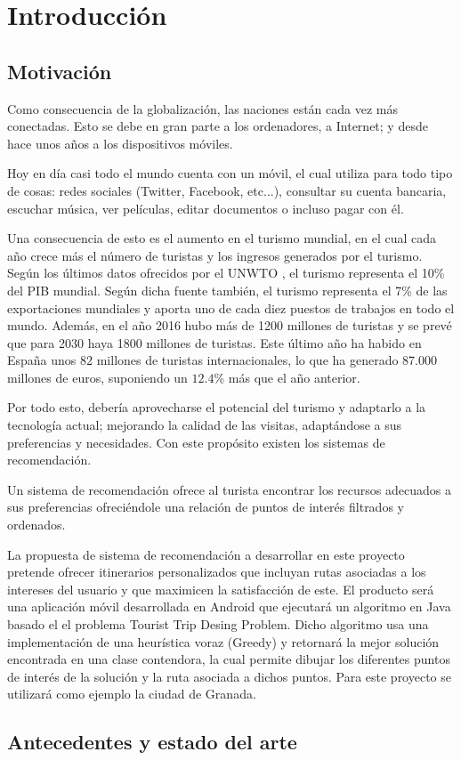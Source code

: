 \chapter{Introducción}

\section[Motivación]{Motivación}
Como consecuencia de la globalización, las naciones están cada vez más conectadas. Esto se debe en gran parte a los ordenadores, a Internet; y desde hace unos años a los dispositivos móviles.\newline

Hoy en día casi todo el mundo cuenta con un móvil, el cual utiliza para todo tipo de cosas: redes sociales (Twitter, Facebook, etc...), consultar su cuenta bancaria, escuchar música, ver películas, editar documentos o incluso pagar con él.\newline

Una consecuencia de esto es el aumento en el turismo mundial, en el cual cada año crece más el número de turistas y los ingresos generados por el turismo. Según los últimos datos ofrecidos por el UNWTO \cite{unwto_resumen}, el turismo representa el 10\% del PIB mundial. Según dicha fuente también, el turismo representa el 7\% de las exportaciones mundiales y aporta uno de cada diez puestos de trabajos en todo el mundo. Además, en el año 2016 hubo más de 1200 millones de turistas y se prevé que para 2030 haya 1800 millones de turistas. Este último año ha habido en España unos 82 millones de turistas internacionales, lo que ha generado 87.000 millones de euros, suponiendo un $12.4\%$ más que el año anterior.\newline

Por todo esto, debería aprovecharse el potencial del turismo y adaptarlo a la tecnología actual; mejorando la calidad de las visitas, adaptándose a sus preferencias y necesidades. Con este propósito existen los sistemas de recomendación.\newline

Un sistema de recomendación ofrece al turista encontrar los recursos adecuados a sus preferencias ofreciéndole una relación de puntos de interés filtrados y ordenados.\newline

La propuesta de sistema de recomendación a desarrollar en este proyecto pretende ofrecer itinerarios personalizados que incluyan rutas asociadas a los intereses del usuario y que maximicen la satisfacción de este. El producto será una aplicación móvil desarrollada en Android que ejecutará un algoritmo en Java basado el el problema Tourist Trip Desing Problem. Dicho algoritmo usa una implementación de una heurística voraz (Greedy) y retornará la mejor solución encontrada en una clase contendora, la cual permite dibujar los diferentes puntos de interés de la solución y la ruta asociada a dichos puntos. Para este proyecto se utilizará como ejemplo la ciudad de Granada.
\section[Antecedentes y estado del arte]{Antecedentes y estado del arte}
	
	


